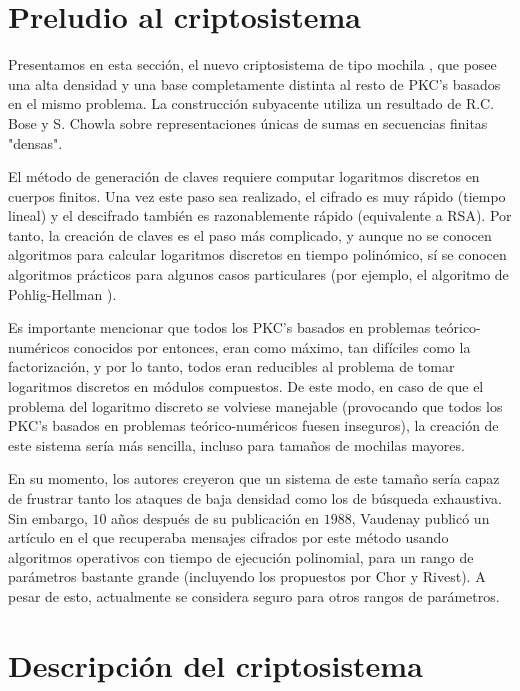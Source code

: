     \section{Preludio al criptosistema}
    
    Presentamos en esta sección, el nuevo criptosistema de tipo mochila \cite{artChorRivest}, que posee una alta densidad y una base completamente distinta al resto de PKC's basados en el mismo problema. La construcción subyacente utiliza un resultado de R.C. Bose y S. Chowla \cite{artBoseChowla} sobre representaciones únicas de sumas en secuencias finitas "densas".
    
    El método de generación de claves requiere computar logaritmos discretos en cuerpos finitos. Una vez este paso sea realizado, el cifrado es muy rápido (tiempo lineal) y el descifrado también es razonablemente rápido (equivalente a RSA). Por tanto, la creación de claves es el paso más complicado, y aunque no se conocen algoritmos para calcular logaritmos discretos en tiempo polinómico, sí se conocen algoritmos prácticos para algunos casos particulares (por ejemplo, el algoritmo de Pohlig-Hellman \cite{artPohligHellman}). 
    
    Es importante mencionar que todos los PKC's basados en problemas teórico-numéricos conocidos por entonces, eran como máximo, tan difíciles como la factorización, y por lo tanto, todos eran reducibles al problema de tomar logaritmos discretos en módulos compuestos. De este modo, en caso de que el problema del logaritmo discreto se volviese manejable (provocando que todos los PKC's basados en problemas teórico-numéricos fuesen inseguros), la creación de este sistema sería más sencilla, incluso para tamaños de mochilas mayores.
    
    En su momento, los autores creyeron que un sistema de este tamaño sería capaz de frustrar tanto los ataques de baja densidad como los de búsqueda exhaustiva. Sin embargo, $10$ años después de su publicación en $1988$, Vaudenay publicó un artículo \cite{artVaudenay} en el que recuperaba mensajes cifrados por este método usando algoritmos operativos con tiempo de ejecución polinomial, para un rango de parámetros bastante grande (incluyendo los propuestos por Chor y Rivest). A pesar de esto, actualmente se considera seguro para otros rangos de parámetros.
    
    \section{Descripción del criptosistema}
    
